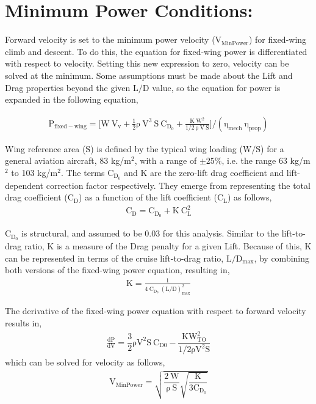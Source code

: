 \documentclass{achemso}
\begin{document}
\vspace{-0.5cm}
\section*{Minimum Power Conditions:}
\vspace{-0.5cm}
Forward velocity is set to the minimum power velocity ($\mathrm{V_{Min Power}}$) for fixed-wing climb and descent\cite{Raymer}. To do this, the equation for fixed-wing power is differentiated with respect to velocity. Setting this new expression to zero, velocity can be solved at the minimum. Some assumptions must be made about the Lift and Drag properties beyond the given $\mathrm{{L}/{D}}$ value, so the equation for power is expanded in the following equation, \cite{Raymer}

\begin{gather*}
    \mathrm{P_{fixed-wing} = \Big[ W\ V_v + \frac{1}{2} \rho\ V^3\ S\ C_{D_0} + \frac{K\ W^2}{1/2\ \rho\ V\ S}\Big] / (\eta_{mech}\ \eta_{prop})}
\end{gather*}

Wing reference area ($\mathrm{S}$) is defined by the typical wing loading ($\mathrm{W/S}$) for a general aviation aircraft, 83 kg/m$\mathrm{^2}$,\cite{Raymer} with a range of $\mathrm{\pm 25\%}$, i.e. the range 63 kg/m$\mathrm{^2}$ to 103 kg/m$\mathrm{^2}$. The terms $\mathrm{C_{D_0}}$ and $\mathrm{K}$ are the zero-lift drag coefficient and lift-dependent correction factor respectively. They emerge from representing the total drag coefficient ($\mathrm{C_D}$) as a function of the lift coefficient ($\mathrm{C_L}$) as follows, \cite{Raymer}
\begin{gather*}
    \mathrm{C_D = C_{D_0} + K\ C_L^2}
\end{gather*}

$\mathrm{C_{D_0}}$ is structural, and assumed to be 0.03 for this analysis. Similar to the lift-to-drag ratio, $\mathrm{K}$ is a measure of the Drag penalty for a given Lift. Because of this, $\mathrm{K}$ can be represented in terms of the cruise lift-to-drag ratio, $\mathrm{{L}/{D}_{max}}$, by combining both versions of the fixed-wing power equation, resulting in,
\begin{gather*}
    \mathrm{K = \frac{1}{4\ C_{D_0}\ (L/D)_{max}^2}}
\end{gather*}

The derivative of the fixed-wing power equation with respect to forward velocity results in,
\begin{gather*}
\mathrm{\frac{dP}{dV} = \dfrac{3}{2}\rho V^2 S\ C_{D0} - \dfrac{K W_{TO}^2}{1/2 \rho V^2 S}}
\end{gather*}
which can be solved for velocity as follows,
\begin{gather*}
 \mathrm{V_{Min Power} = \sqrt{\dfrac{2\ W}{\rho\ S}\sqrt{\dfrac{K}{3C_{D_0}}}}}
\end{gather*}
\end{document}
